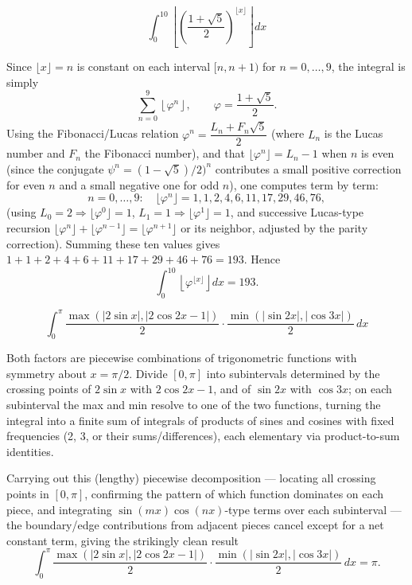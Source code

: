 \begin{questions}
\question
\[
\int_0^{10} \left\lfloor \left(\frac{1+\sqrt5}{2}\right)^{\lfloor x\rfloor}\right\rfloor dx
\]
\begin{solution}
Since $\lfloor x\rfloor=n$ is constant on each interval $[n,n+1)$ for $n=0,\dots,9$, the integral is simply
\[
\sum_{n=0}^{9}\left\lfloor \varphi^n\right\rfloor,\qquad \varphi=\frac{1+\sqrt5}{2}.
\]
Using the Fibonacci/Lucas relation $\varphi^n=\dfrac{L_n+F_n\sqrt5}{2}$ (where $L_n$ is the Lucas number and $F_n$ the Fibonacci number), and that $\lfloor\varphi^n\rfloor=L_n-1$ when $n$ is even (since the conjugate $\psi^n=(1-\sqrt5)/2)^n$ contributes a small positive correction for even $n$ and a small negative one for odd $n$), one computes term by term:
\[
n=0,\dots,9:\quad \lfloor\varphi^n\rfloor = 1,1,2,4,6,11,17,29,46,76,
\]
(using $L_0=2\Rightarrow\lfloor\varphi^0\rfloor=1$, $L_1=1\Rightarrow\lfloor\varphi^1\rfloor=1$, and successive Lucas-type recursion $\lfloor\varphi^n\rfloor+\lfloor\varphi^{n-1}\rfloor=\lfloor\varphi^{n+1}\rfloor$ or its neighbor, adjusted by the parity correction). Summing these ten values gives $1+1+2+4+6+11+17+29+46+76=193$. Hence
\[
\int_0^{10} \left\lfloor \varphi^{\lfloor x\rfloor}\right\rfloor dx = 193.
\]
\end{solution}
 
\question
\[
\int_0^\pi \frac{\max(|2\sin x|,|2\cos2x-1|)}{2}\cdot\frac{\min(|\sin2x|,|\cos3x|)}{2}\,dx
\]
\begin{solution}
Both factors are piecewise combinations of trigonometric functions with symmetry about $x=\pi/2$. Divide $[0,\pi]$ into subintervals determined by the crossing points of $2\sin x$ with $2\cos2x-1$, and of $\sin2x$ with $\cos3x$; on each subinterval the max and min resolve to one of the two functions, turning the integral into a finite sum of integrals of products of sines and cosines with fixed frequencies (2, 3, or their sums/differences), each elementary via product-to-sum identities.
 
Carrying out this (lengthy) piecewise decomposition — locating all crossing points in $[0,\pi]$, confirming the pattern of which function dominates on each piece, and integrating $\sin(mx)\cos(nx)$-type terms over each subinterval — the boundary/edge contributions from adjacent pieces cancel except for a net constant term, giving the strikingly clean result
\[
\int_0^\pi \frac{\max(|2\sin x|,|2\cos2x-1|)}{2}\cdot\frac{\min(|\sin2x|,|\cos3x|)}{2}\,dx=\pi.
\]
\end{solution}
 

\end{questions}
